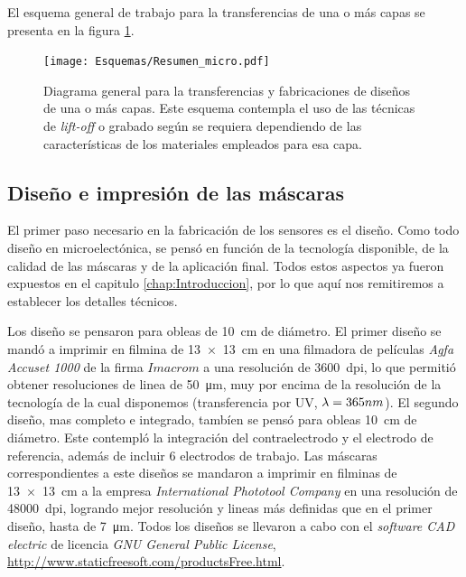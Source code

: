 	El esquema general de trabajo para la transferencias de una o más capas se presenta en la figura \ref{esq:micro}.

			\begin{figure}[ht]
			  \begin{center}
			  \texttt{[image: Esquemas/Resumen\_micro.pdf]}
			  \caption[Esquema para la transferencia de los diseños]{Diagrama general para la transferencias y fabricaciones de diseños de una o más capas. Este esquema contempla el uso de las técnicas de \textit{lift-off }o grabado según se requiera dependiendo de las características de los materiales empleados para esa capa.}
			  \label{esq:micro}
			  \end{center}
			  \end{figure}
			  
	\subsection{Diseño e impresión de las máscaras}\label{sec:impresion_mascaras}

		El primer paso necesario en la fabricación de los sensores es el diseño. Como todo diseño en microelectónica, se pensó en función de la tecnología disponible, de la calidad de las máscaras y de la aplicación final. Todos estos aspectos ya fueron expuestos en el capitulo \ref{chap:Introduccion}, por lo que aquí nos remitiremos a establecer los detalles técnicos.

		Los diseño se pensaron para obleas de \SI{10}{\cm} de diámetro. El primer diseño se mandó a imprimir en filmina de \SI{13x13}{\cm} en una filmadora de películas \textit{Agfa Accuset 1000} de la firma $Imacrom$ a una resolución de \SI{3600}{dpi}, lo que permitió obtener resoluciones de linea de \SI{50}{\um}, muy por encima de la resolución de la tecnología de la cual disponemos (transferencia por UV, $\lambda\index{longitud de onda}=365nm$). El segundo diseño, mas completo e integrado, tambíen se pensó para obleas \SI{10}{\cm} de diámetro. Este contempló la integración del contraelectrodo y el electrodo de referencia, además de incluir 6 electrodos de trabajo. Las máscaras correspondientes a este diseños se mandaron a imprimir en filminas de \SI{13x13}{\cm} a la empresa \textit{International Phototool Company} en una resolución de \SI{48000}{dpi}, logrando mejor resolución y lineas más definidas que en el primer diseño, hasta de \SI{7}{\um}. Todos los diseños se llevaron a cabo con el \textit{software CAD electric} de licencia \textit{GNU General Public License}, \url{http://www.staticfreesoft.com/productsFree.html}.
				
